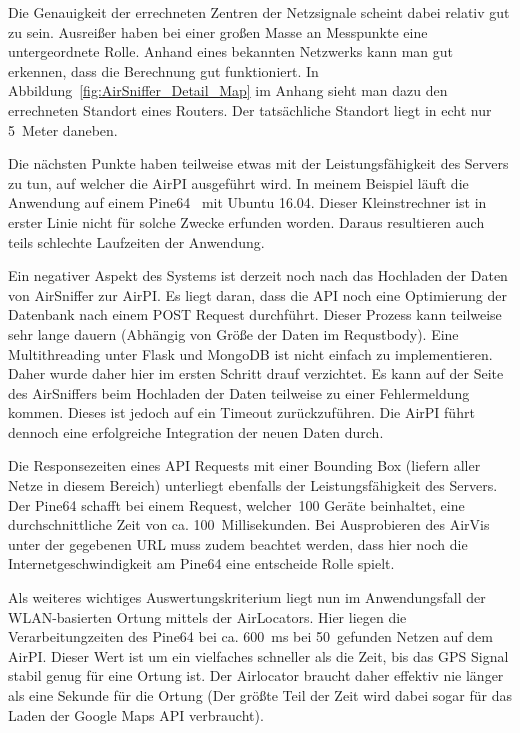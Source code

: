 \documentclass[11pt,a4paper]{article}
\begin{document}
Die Genauigkeit der errechneten Zentren der Netzsignale scheint dabei relativ gut zu sein. Ausreißer haben bei einer großen Masse an Messpunkte eine untergeordnete Rolle. Anhand eines bekannten Netzwerks kann man gut erkennen, dass die Berechnung gut funktioniert. In Abbildung~\ref{fig:AirSniffer_Detail_Map} im Anhang sieht man dazu den errechneten Standort eines Routers. Der tatsächliche Standort liegt in echt nur 5~Meter daneben.

Die nächsten Punkte haben teilweise etwas mit der Leistungsfähigkeit des Servers zu tun, auf welcher die AirPI ausgeführt wird. In meinem Beispiel läuft die Anwendung auf einem Pine64~\cite{pine64} mit Ubuntu 16.04. Dieser Kleinstrechner ist in erster Linie nicht für solche Zwecke erfunden worden. Daraus resultieren auch teils schlechte Laufzeiten der Anwendung.

Ein negativer Aspekt des Systems ist derzeit noch nach das Hochladen der Daten von AirSniffer zur AirPI. Es liegt daran, dass die API noch eine Optimierung der Datenbank nach einem POST Request durchführt. Dieser Prozess kann teilweise sehr lange dauern (Abhängig von Größe der Daten im Requstbody). Eine Multithreading unter Flask und MongoDB ist nicht einfach zu implementieren. Daher wurde daher hier im ersten Schritt drauf verzichtet. Es kann auf der Seite des AirSniffers beim Hochladen der Daten teilweise zu einer Fehlermeldung kommen. Dieses ist jedoch auf ein Timeout zurückzuführen. Die AirPI führt dennoch eine erfolgreiche Integration der neuen Daten durch.

Die Responsezeiten eines API Requests mit einer Bounding Box (liefern aller Netze in diesem Bereich) unterliegt ebenfalls der Leistungsfähigkeit des Servers. Der Pine64 schafft bei einem Request, welcher~100 Geräte beinhaltet, eine durchschnittliche Zeit von ca. 100~Millisekunden. Bei Ausprobieren des AirVis unter der gegebenen URL muss zudem beachtet werden, dass hier noch die Internetgeschwindigkeit am Pine64 eine entscheide Rolle spielt.

Als weiteres wichtiges Auswertungskriterium liegt nun im Anwendungsfall der WLAN-basierten Ortung mittels der AirLocators. Hier liegen die Verarbeitungzeiten des Pine64 bei ca. 600~ms bei 50~gefunden Netzen auf dem AirPI. Dieser Wert ist um ein vielfaches schneller als die Zeit, bis das GPS Signal stabil genug für eine Ortung ist. Der Airlocator braucht daher effektiv nie länger als eine Sekunde für die Ortung (Der größte Teil der Zeit wird dabei sogar für das Laden der Google Maps API verbraucht).
\end{document}
